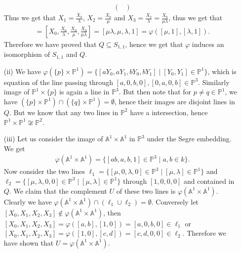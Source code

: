 \documentclass[12pt]{article}
\begin{document}
\begin{enumerate}
\begin{align*}
\begin{pmatrix}
                                                                                                \end{pmatrix}
        \end{align*}
        Thus we get that $X_1 = \frac{X_0}{\lambda}$, $X_2 = \frac{X_0}{\mu}$ and $X_3 = \frac{X_2}{\lambda} = \frac{X_0}{\mu\lambda}$, thus we get that
        \begin{align*}
            [X_0,X_1,X_2,X_3] = \left[ X_0, \frac{X_0}{\lambda}, \frac{X_0}{\mu}, \frac{X_0}{\mu\lambda} \right] = [\mu\lambda,\mu,\lambda,1] = \varphi([\mu,1],[\lambda,1]).
        \end{align*}
        Therefore we have proved that $Q \subseteq S_{1,1}$, hence we get that $\varphi$ induces an isomorphism of $S_{1,1}$ and $Q$.

    \item[(ii)] We have $\varphi(\{p\} \times \mathbb{P}^1) = \{ [aY_0, aY_1, bY_0, bY_1] \mid [Y_0,Y_1] \in \mathbb{P}^1 \}$, which is equation of the line passing through $[a,0,b,0],[0,a,0,b] \in \mathbb{P}^3$. Similarly image of $\mathbb{P}^1 \times \{p\}$ is again a line in $\mathbb{P}^3$. But then note that for $p \neq q \in \mathbb{P}^1$, we have $(\{p\} \times \mathbb{P}^1) \cap (\{q\} \times \mathbb{P}^1) = \emptyset$, hence their images are disjoint lines in $Q$. But we know that any two lines in $\mathbb{P}^2$ have a intersection, hence $\mathbb{P}^1 \times \mathbb{P}^1 \not\cong \mathbb{P}^2$.

    \item[(iii)] Let us consider the image of $\mathbb{A}^1 \times \mathbb{A}^1$ in $\mathbb{P}^3$ under the Segre embedding. We get
        \begin{align*}
            \varphi(\mathbb{A}^1 \times \mathbb{A}^1) = \{ [ab,a,b,1] \in \mathbb{P}^3 \mid a,b \in k \}.
        \end{align*}
        Now consider the two lines $\ell_1 = \{[\mu,0,\lambda,0] \in \mathbb{P}^3 \mid [\mu,\lambda] \in \mathbb{P}^1 \}$ and $\ell_2 = \{[\mu,\lambda,0,0] \in \mathbb{P}^3 \mid [\mu,\lambda] \in \mathbb{P}^1 \}$ through $[1,0,0,0]$ and contained in $Q$. We claim that the complement $U$ of these two lines is $\varphi(\mathbb{A}^1 \times \mathbb{A}^1)$. Clearly we have $\varphi(\mathbb{A}^1 \times \mathbb{A}^1) \cap (\ell_1 \cup \ell_2) = \emptyset$. Conversely let $[X_0,X_1,X_2,X_3] \notin \varphi(\mathbb{A}^1 \times \mathbb{A}^1)$, then $[X_0,X_1,X_2,X_3] = \varphi([a,b],[1,0]) = [a,0,b,0] \in \ell_1$ or $[X_0,X_1,X_2,X_3] = \varphi([1,0],[c,d]) = [c,d,0,0] \in \ell_2$. Therefore we have shown that $U = \varphi(\mathbb{A}^1 \times \mathbb{A}^1)$.


\end{enumerate}
\end{document}
